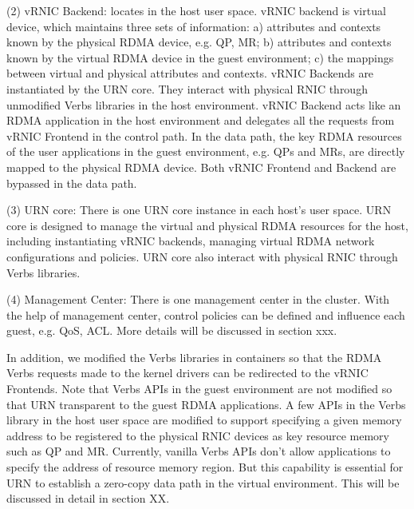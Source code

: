 (2) vRNIC Backend: locates in the host user space. vRNIC backend is virtual device, which maintains three sets of information: a) attributes and contexts known by the physical RDMA device, e.g. QP, MR; b) attributes and contexts known by the virtual RDMA device in the guest environment; c) the mappings between virtual and physical attributes and contexts. vRNIC Backends are instantiated by the URN core. They interact with physical RNIC through unmodified Verbs libraries in the host environment. vRNIC Backend acts like an RDMA application in the host environment and delegates all the requests from vRNIC Frontend in the control path. In the data path, the key RDMA resources of the user applications in the guest environment, e.g. QPs and MRs, are directly mapped to the physical RDMA device. Both vRNIC Frontend and Backend are bypassed in the data path.

(3) URN core: There is one URN core instance in each host's user space. URN core is designed to manage the virtual and physical RDMA resources for the host, including instantiating vRNIC backends, managing virtual RDMA network configurations and policies. URN core also interact with physical RNIC through Verbs libraries. 

(4) Management Center: There is one management center in the cluster. With the help of management center, control policies can be defined and influence each guest, e.g. QoS, ACL. More details will be discussed in section xxx.

In addition,  we modified the Verbs libraries in containers so that the RDMA Verbs requests made to the kernel drivers can be redirected to the vRNIC Frontends. Note that Verbs APIs in the guest environment are not modified so that URN transparent to the guest RDMA applications. A few APIs in the Verbs library in the host user space are modified to support specifying a given memory address to be registered to the physical RNIC devices as key resource memory such as QP and MR. Currently, vanilla Verbs APIs don't allow applications to specify the address of resource memory region. But this capability is essential for URN to establish a zero-copy data path in the virtual environment. This will be discussed in detail in section XX.
